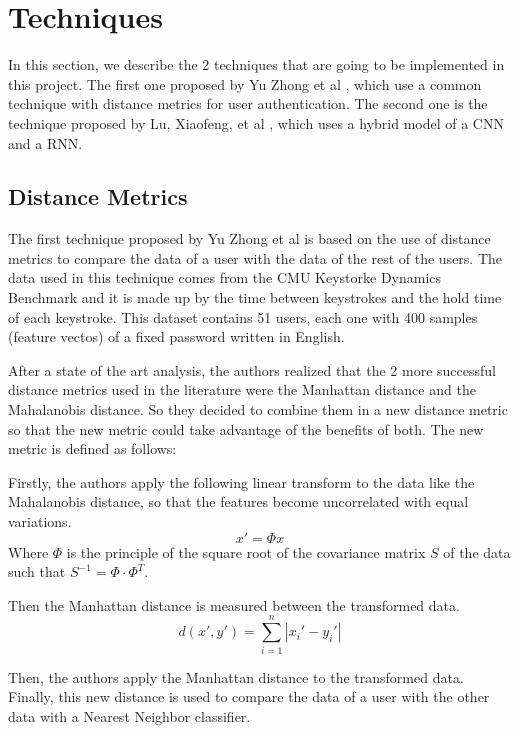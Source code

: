 \section{Techniques}

In this section, we describe the 2 techniques that are going to be implemented in this project. The first one proposed by Yu Zhong et al \cite{combine_distance}, which use a common technique with distance metrics for user authentication. The second one is the technique proposed by Lu, Xiaofeng, et al \cite{deep_learning}, which uses a hybrid model of a CNN and a RNN.

\subsection{Distance Metrics}

The first technique proposed by Yu Zhong et al \cite{combine_distance} is based on the use of distance metrics to compare the data of a user with the data of the rest of the users. The data used in this technique comes from the CMU Keystorke Dynamics Benchmark and it is made up by the time between keystrokes and the hold time of each keystroke. This dataset contains 51 users, each one with 400 samples (feature vectos) of a fixed password written in English.

After a state of the art analysis, the authors realized that the 2 more successful distance metrics used in the literature were the Manhattan distance and the Mahalanobis distance. So they decided to combine them in a new distance metric so that the new metric could take advantage of the benefits of both. The new metric is defined as follows:

Firstly, the authors apply the following linear transform to the data like the Mahalanobis distance, so that the features become uncorrelated with equal variations.
\begin{equation}
	x' = \Phi x
\end{equation}
Where $\Phi$ is the principle of the square root of the covariance matrix $S$ of the data such that $S^{-1} = \Phi \cdot \Phi^T$.

Then the Manhattan distance is measured between the transformed data.
\begin{equation}
	d(x',y') = \sum_{i=1}^{n} |x_i' - y_i'|
\end{equation}

Then, the authors apply the Manhattan distance to the transformed data. Finally, this new distance is used to compare the data of a user with the other data with a Nearest Neighbor classifier.

